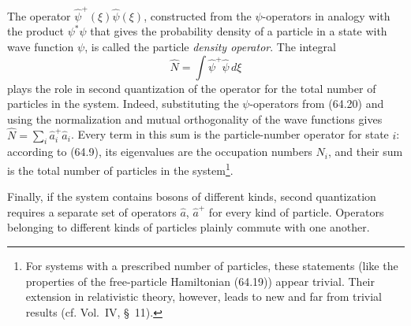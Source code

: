 The operator $\hat\psi^+(\xi)\hat\psi(\xi)$, constructed from the $\psi$-operators in analogy with the product $\psi^*\psi$ that gives the probability density of a particle in a state with wave function $\psi$, is called the particle \emph{density operator}. The integral
\begin{equation}
 \hat N=\int\hat\psi^+\hat\psi\,d\xi
 \tag{64.26}
\end{equation}
plays the role in second quantization of the operator for the total number of particles in the system. Indeed, substituting the $\psi$-operators from (64.20) and using the normalization and mutual orthogonality of the wave functions gives $\hat N=\sum_i\hat a_i^+\hat a_i$. Every term in this sum is the particle-number operator for state $i$: according to (64.9), its eigenvalues are the occupation numbers $N_i$, and their sum is the total number of particles in the system\footnote{For systems with a prescribed number of particles, these statements (like the properties of the free-particle Hamiltonian (64.19)) appear trivial. Their extension in relativistic theory, however, leads to new and far from trivial results (cf. Vol.~IV, §~11).}.

Finally, if the system contains bosons of different kinds, second quantization requires a separate set of operators $\hat a$, $\hat a^+$ for every kind of particle. Operators belonging to different kinds of particles plainly commute with one another.
